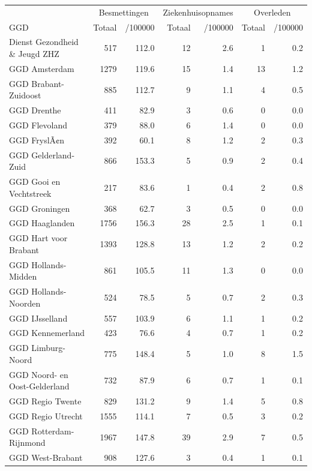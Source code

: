 \documentclass[
  english,
  man,floatsintext]{apa6}
\begin{document}
\begin{table}
\centering\begingroup\fontsize{10}{12}\selectfont

\begin{threeparttable}
\begin{tabular}{lrrrrrr}
\toprule
\multicolumn{1}{c}{ } & \multicolumn{2}{c}{Besmettingen} & \multicolumn{2}{c}{Ziekenhuisopnames} & \multicolumn{2}{c}{Overleden} \\
\cmidrule(l{3pt}r{3pt}){2-3} \cmidrule(l{3pt}r{3pt}){4-5} \cmidrule(l{3pt}r{3pt}){6-7}
GGD & Totaal & /100000 & Totaal & /100000 & Totaal & /100000\\
\midrule
Dienst Gezondheid \& Jeugd ZHZ & 517 & 112.0 & 12 & 2.6 & 1 & 0.2\\
GGD Amsterdam & 1279 & 119.6 & 15 & 1.4 & 13 & 1.2\\
GGD Brabant-Zuidoost & 885 & 112.7 & 9 & 1.1 & 4 & 0.5\\
GGD Drenthe & 411 & 82.9 & 3 & 0.6 & 0 & 0.0\\
GGD Flevoland & 379 & 88.0 & 6 & 1.4 & 0 & 0.0\\
GGD FryslÃ¢n & 392 & 60.1 & 8 & 1.2 & 2 & 0.3\\
GGD Gelderland-Zuid & 866 & 153.3 & 5 & 0.9 & 2 & 0.4\\
GGD Gooi en Vechtstreek & 217 & 83.6 & 1 & 0.4 & 2 & 0.8\\
GGD Groningen & 368 & 62.7 & 3 & 0.5 & 0 & 0.0\\
GGD Haaglanden & 1756 & 156.3 & 28 & 2.5 & 1 & 0.1\\
GGD Hart voor Brabant & 1393 & 128.8 & 13 & 1.2 & 2 & 0.2\\
GGD Hollands-Midden & 861 & 105.5 & 11 & 1.3 & 0 & 0.0\\
GGD Hollands-Noorden & 524 & 78.5 & 5 & 0.7 & 2 & 0.3\\
GGD IJsselland & 557 & 103.9 & 6 & 1.1 & 1 & 0.2\\
GGD Kennemerland & 423 & 76.6 & 4 & 0.7 & 1 & 0.2\\
GGD Limburg-Noord & 775 & 148.4 & 5 & 1.0 & 8 & 1.5\\
GGD Noord- en Oost-Gelderland & 732 & 87.9 & 6 & 0.7 & 1 & 0.1\\
GGD Regio Twente & 829 & 131.2 & 9 & 1.4 & 5 & 0.8\\
GGD Regio Utrecht & 1555 & 114.1 & 7 & 0.5 & 3 & 0.2\\
GGD Rotterdam-Rijnmond & 1967 & 147.8 & 39 & 2.9 & 7 & 0.5\\
GGD West-Brabant & 908 & 127.6 & 3 & 0.4 & 1 & 0.1\\

\end{tabular}
\end{threeparttable}
\end{table}
\end{document}

